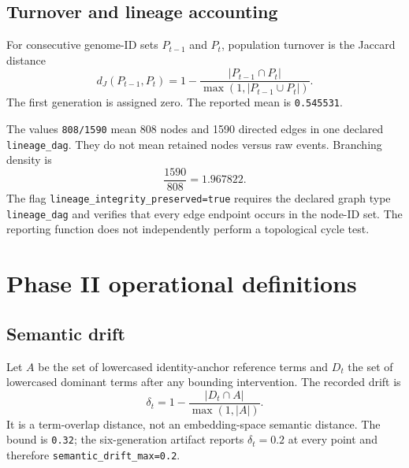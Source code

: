 \documentclass[10pt]{article}
\begin{document}
\subsection{Turnover and lineage accounting}

For consecutive genome-ID sets $P_{t-1}$ and $P_t$, population turnover is the
Jaccard distance
\[
 d_J(P_{t-1},P_t)
 = 1-\frac{|P_{t-1}\cap P_t|}{\max(1,|P_{t-1}\cup P_t|)}.
\]
The first generation is assigned zero. The reported mean is \texttt{0.545531}.

The values \texttt{808/1590} mean 808 nodes and 1590 directed edges in one
declared \texttt{lineage\_dag}. They do not mean retained nodes versus raw
events. Branching density is
\[
 \frac{1590}{808}=1.967822.
\]
The flag \texttt{lineage\_integrity\_preserved=true} requires the declared
graph type \texttt{lineage\_dag} and verifies that every edge endpoint occurs
in the node-ID set. The reporting function does not independently perform a
topological cycle test.

\section{Phase II operational definitions}

\subsection{Semantic drift}

Let $A$ be the set of lowercased identity-anchor reference terms and $D_t$ the
set of lowercased dominant terms after any bounding intervention. The recorded
drift is
\[
 \delta_t=1-\frac{|D_t\cap A|}{\max(1,|A|)}.
\]
It is a term-overlap distance, not an embedding-space semantic distance. The
bound is \texttt{0.32}; the six-generation artifact reports
$\delta_t=0.2$ at every point and therefore \texttt{semantic\_drift\_max=0.2}.
\end{document}

